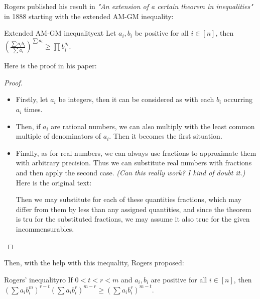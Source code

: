 Rogers published his result in \textit{"An extension of a certain theorem in inequalities"} in 1888 starting with the extended AM-GM inequality:

\begin{thm}{Extended AM-GM inequality}{ext}
    Let $a_i, b_i$ be positive for all $i \in [n]$, then
    \begin{math}
        (\frac{\sum a_i b_i}{\sum a_i})^{\sum a_i} \ge \prod b_i^{a_i}
    .\end{math}
\end{thm}

Here is the proof in his paper:

\begin{proof}[Proof]
    ~
    \begin{itemize}
        \item Firstly, let $a_i$ be integers, then it can be considered as  with each $b_i$ occurring $a_i$ times.
        \item Then, if $a_i$ are rational numbers, we can also multiply with the least common multiple of denominators of $a_i$. Then it becomes the first situation.
        \item Finally, as for real numbers, we can always use fractions to approximate them with arbitrary precision. Thus we can substitute real numbers with fractions and then apply the second case. \textit{(Can this really work? I kind of doubt it.)} Here is the original text:
            \begin{qte}
                Then we may substitute for each of these quantities fractions, which may differ from them by less than any assigned quantities, and since the theorem is tru for the substituted fractions, we may assume it also true for the given incommensurables.
            \end{qte}
    \end{itemize}
\end{proof}

Then, with the help with this inequality, Rogers proposed:
\begin{thm}{Rogers' inequality}{ro}
    If $0 < t < r < m$ and $a_i, b_i$ are positive for all $i \in [n]$, then
    \begin{math}
        (\sum a_i b_i^m)^{r-t} (\sum a_ib_i^r)^{m-r} \ge (\sum a_i b_i^r)^{m-t}
    .\end{math}
\end{thm}

